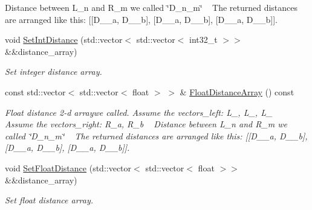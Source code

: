 \begin{DoxyCompactItemize}
\begin{DoxyCompactList}
 Distance between L\+\_\+n and R\+\_\+m we called \char`\"{}\+D\+\_\+n\+\_\+m\char`\"{} ~\newline
 The returned distances are arranged like this\+: \mbox{[}\mbox{[}D\+\_\+\_\+a, D\+\_\+\_\+b\mbox{]}, \mbox{[}D\+\_\+\_\+a, D\+\_\+\_\+b\mbox{]}, \mbox{[}D\+\_\+\_\+a, D\+\_\+\_\+b\mbox{]}\mbox{]}. \end{DoxyCompactList}\item 
\mbox{\label{classmilvus_1_1_distance_array_a61962fb3b84dcad9e02b7bd0b3bc21fe}} 
void \hyperlink{classmilvus_1_1_distance_array_a61962fb3b84dcad9e02b7bd0b3bc21fe}{Set\+Int\+Distance} (std\+::vector$<$ std\+::vector$<$ int32\+\_\+t $>$$>$ \&\&distance\+\_\+array)
\begin{DoxyCompactList}\small\item\em Set integer distance array. \end{DoxyCompactList}\item 
\mbox{\label{classmilvus_1_1_distance_array_a0e8e9ec651b51ec7032095a801d33121}} 
const std\+::vector$<$ std\+::vector$<$ float $>$ $>$ \& \hyperlink{classmilvus_1_1_distance_array_a0e8e9ec651b51ec7032095a801d33121}{Float\+Distance\+Array} () const
\begin{DoxyCompactList}\small\item\em Float distance 2-\/d arraywe called. Assume the vectors\+\_\+left\+: L\+\_, L\+\_, L\+\_ ~\newline
 Assume the vectors\+\_\+right\+: R\+\_\+a, R\+\_\+b ~\newline
 Distance between L\+\_\+n and R\+\_\+m we called \char`\"{}\+D\+\_\+n\+\_\+m\char`\"{} ~\newline
 The returned distances are arranged like this\+: \mbox{[}\mbox{[}D\+\_\+\_\+a, D\+\_\+\_\+b\mbox{]}, \mbox{[}D\+\_\+\_\+a, D\+\_\+\_\+b\mbox{]}, \mbox{[}D\+\_\+\_\+a, D\+\_\+\_\+b\mbox{]}\mbox{]}. \end{DoxyCompactList}\item 
\mbox{\label{classmilvus_1_1_distance_array_a8b09380ce9272a1a7a8b6bc708d42d34}} 
void \hyperlink{classmilvus_1_1_distance_array_a8b09380ce9272a1a7a8b6bc708d42d34}{Set\+Float\+Distance} (std\+::vector$<$ std\+::vector$<$ float $>$$>$ \&\&distance\+\_\+array)
\begin{DoxyCompactList}\small\item\em Set float distance array. \end{DoxyCompactList}\end{DoxyCompactItemize}


